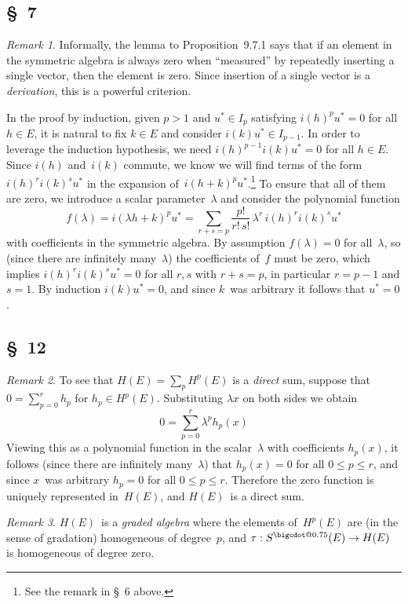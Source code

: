 \documentclass[letterpaper,12pt]{article}
\makeatletter
\newcommand{\bigcdot}[1]{\mathbin{\mathpalette\bigcdot@{#1}}}
\newcommand{\bigcdot@}[2]{%
  \sbox0{$#1\vcenter{}$}%
  \sbox2{$#1\cdot\m@th$}%
  \hbox{%
    \hfil
    \raise\ht0\hbox{%
      \scalebox{#2}{%
        \lower\ht0\hbox{$#1\bullet\m@th$}%
      }%
    }%
    \hfil
  }%
}
\newcommand{\sdot}{\bigcdot{0.75}}
\theoremstyle{definition}
\theoremstyle{remark}
\newtheorem*{rmk}{Remark}
\makeatother
\begin{document}
\subsection*{\S~7}
\begin{rmk}
Informally, the lemma to Proposition~9.7.1 says that if an element in the symmetric algebra is always zero when ``measured'' by repeatedly inserting a single vector, then the element is zero. Since insertion of a single vector is a \emph{derivation}, this is a powerful criterion.

In the proof by induction, given \(p>1\) and \(u^*\in I_p\) satisfying \(i(h)^p u^*=0\) for all \(h\in E\), it is natural to fix \(k\in E\) and consider \(i(k)u^*\in I_{p-1}\). In order to leverage the induction hypothesis, we need \(i(h)^{p-1}i(k)u^*=0\) for all \(h\in E\). Since \(i(h)\) and~\(i(k)\) commute, we know we will find terms of the form \(i(h)^ri(k)^su^*\) in the expansion of~\(i(h+k)^pu^*\).\footnote{See the remark in \S~6 above.} To ensure that all of them are zero, we introduce a scalar parameter~\(\lambda\) and consider the polynomial function
\[f(\lambda)=i(\lambda h+k)^pu^*=\sum_{r+s=p}\frac{p!}{r!\,s!}\,\lambda^r\,i(h)^ri(k)^su^*\]
with coefficients in the symmetric algebra. By assumption \(f(\lambda)=0\) for all~\(\lambda\), so (since there are infinitely many~\(\lambda\)) the coefficients of~\(f\) must be zero, which implies \(i(h)^ri(k)^su^*=0\) for all \(r,s\) with \(r+s=p\), in particular \(r=p-1\) and \(s=1\). By induction \(i(k)u^*=0\), and since \(k\)~was arbitrary it follows that \(u^*=0\).
\end{rmk}

\subsection*{\S~12}
\begin{rmk}
To see that \(H(E)=\sum_p H^p(E)\) is a \emph{direct} sum, suppose that \(0=\sum_{p=0}^r h_p\) for \(h_p\in H^p(E)\). Substituting \(\lambda x\) on both sides we obtain
\[0=\sum_{p=0}^r \lambda^p h_p(x)\]
Viewing this as a polynomial function in the scalar~\(\lambda\) with coefficients \(h_p(x)\), it follows (since there are infinitely many~\(\lambda\)) that \(h_p(x)=0\) for all \(0\le p\le r\), and since \(x\)~was arbitrary \(h_p=0\) for all \(0\le p\le r\). Therefore the zero function is uniquely represented in~\(H(E)\), and \(H(E)\)~is a direct sum.
\end{rmk}

\begin{rmk}
\(H(E)\)~is a \emph{graded algebra} where the elements of~\(H^p(E)\) are (in the sense of gradation) homogeneous of degree~\(p\), and \(\tau:S^{\sdot}(E)\to H(E)\) is homogeneous of degree zero.
\end{rmk}
\end{document}

